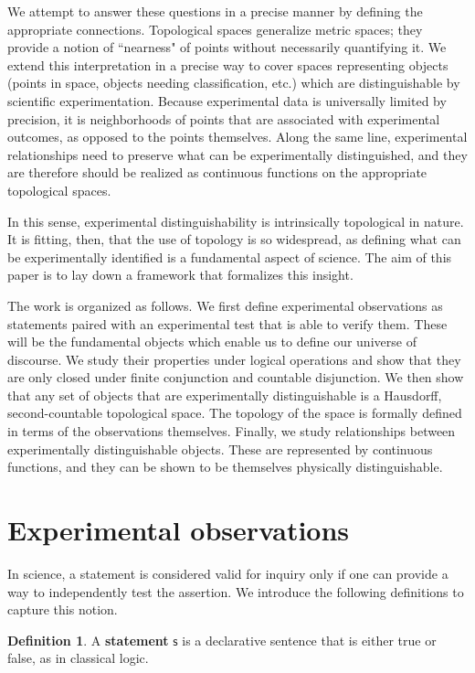 \documentclass[review]{elsarticle}
\theoremstyle{plain}%
\theoremstyle{definition}
\newtheorem{defn}{Definition}[section]
\theoremstyle{remark}
\begin{document}
We attempt to answer these questions in a precise manner by defining the appropriate connections. Topological spaces generalize metric spaces; they provide a notion of ``nearness" of points without necessarily quantifying it. We extend this interpretation in a precise way to cover spaces representing objects (points in space, objects needing classification, etc.) which are distinguishable by scientific experimentation. Because experimental data is universally limited by precision, it is neighborhoods of points that are associated with experimental outcomes, as opposed to the points themselves. Along the same line, experimental relationships need to preserve what can be experimentally distinguished, and they are therefore should be realized as continuous functions on the appropriate topological spaces.

In this sense, experimental distinguishability is intrinsically topological in nature. It is fitting, then, that the use of topology is so widespread, as defining what can be experimentally identified is a fundamental aspect of science. The aim of this paper is to lay down a framework that formalizes this insight. 

The work is organized as follows. We first define experimental observations as statements paired with an experimental test that is able to verify them. These will be the fundamental objects which enable us to define our universe of discourse. We study their properties under logical operations and show that they are only closed under finite conjunction and countable disjunction.  We then show that any set of objects that are experimentally distinguishable is a Hausdorff, second-countable topological space. The topology of the space is formally defined in terms of the observations themselves.  Finally, we study relationships between experimentally distinguishable objects. These are represented by continuous functions, and they can be shown to be themselves physically distinguishable.


\section{Experimental observations}

In science, a statement is considered valid for inquiry only if one can provide a way to independently test the assertion. We introduce the following definitions to capture this notion. 


\begin{defn}
	A \textbf{statement} $\mathsf{s}$ is a declarative sentence that is either true or false, as in classical logic. 
\end{defn}
\end{document}
